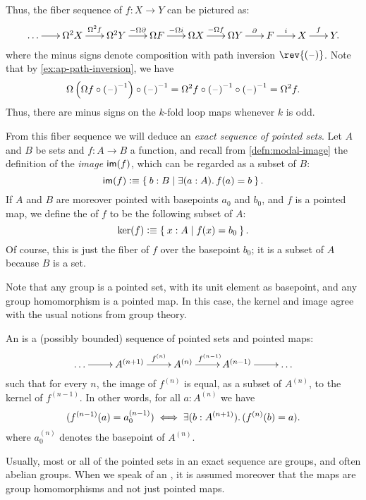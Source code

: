 Thus, the fiber sequence of $f:X\to Y$ can be pictured as:
\[\xymatrix@C=1.5pc{
  \dots \ar[r] &
  \Omega^2 X \ar[r]^-{\Omega^2 f} &
  \Omega^2 Y \ar[r]^-{-\Omega \partial} &
  \Omega F \ar[r]^-{-\Omega i} &
  \Omega X \ar[r]^-{-\Omega f} &
  \Omega Y \ar[r]^-{\partial} &
  F \ar[r]^-{i} &
  X \ar[r]^{f} & Y.}\]
where the minus signs denote composition with path inversion $\rev{(\blank)}$.
Note that by \cref{ex:ap-path-inversion}, we have
\[ \Omega\left(\Omega f\circ \mathord{{(\mathord{\hspace{1pt}\text{--}\hspace{1pt}})}^{-1}}\right) \circ \mathord{{(\mathord{\hspace{1pt}\text{--}\hspace{1pt}})}^{-1}}
= \Omega^2 f \circ \mathord{{(\mathord{\hspace{1pt}\text{--}\hspace{1pt}})}^{-1}} \circ \mathord{{(\mathord{\hspace{1pt}\text{--}\hspace{1pt}})}^{-1}}
= \Omega^2 f.
\]
Thus, there are minus signs on the $k$-fold loop maps whenever $k$ is odd.

From this fiber sequence we will deduce an \emph{exact sequence of pointed sets}.
%
Let $A$ and $B$ be sets and $f:A\to B$ a function, and recall from \cref{defn:modal-image} the definition of the \emph{image} $\mathsf{im}(f)$, which can be regarded as a subset of $B$:
\[\im(f) \defeq \setof{b:B | \exis{a:A} f(a)=b}. \]
If $A$ and $B$ are moreover pointed with basepoints $a_0$ and $b_0$, and $f$ is a pointed map, we define the 
%
%
of $f$ to be the following subset of $A$:
\[\ker(f) \vcentcolon\equiv \Set{x:A | f(x) = b_0}. \]
Of course, this is just the fiber of $f$ over the basepoint $b_0$; it is a subset of $A$ because $B$ is a set.

Note that any group is a pointed set, with its unit element as basepoint, and any group homomorphism is a pointed map.
In this case, the kernel and image agree with the usual notions from group theory.

\begin{defn}
  An 
  is a (possibly bounded) sequence of pointed sets and pointed maps:
  \[\xymatrix{\dots \ar[r] & A^{(n+1)} \ar[r]^-{f^{(n)}} & A^{(n)} \ar[r]^{f^{(n-1)}} & A^{(n-1)} \ar[r] &
    \dots}\]
  such that for every $n$, the image of $f^{(n)}$ is equal, as a subset of $A^{(n)}$, to the kernel of $f^{(n-1)}$.
  In other words, for all $a:A^{(n)}$ we have
  \[ (f^{(n-1)}(a) = a^{(n-1)}_0) \iff \exis{b:A^{(n+1)}} (f^{(n)}(b)=a). \]
  where $a^{(n)}_0$ denotes the basepoint of $A^{(n)}$.
\end{defn}

Usually, most or all of the pointed sets in an exact sequence are groups, and often abelian groups.
When we speak of an , it is assumed moreover that the maps are group homomorphisms and not just pointed maps.

